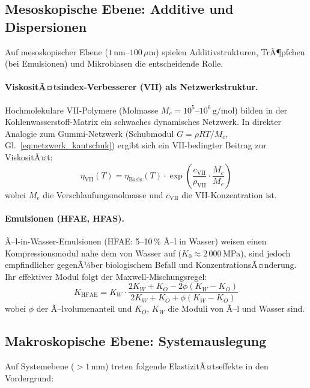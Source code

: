 ﻿\documentclass[a4paper,12pt]{scrreprt}
\theoremstyle{definition}
\begin{document}
\subsection{Mesoskopische Ebene: Additive und Dispersionen}

Auf mesoskopischer Ebene ($1\,\mathrm{nm}$--$100\,\mu\mathrm{m}$) spielen
Additivstrukturen, TrÃ¶pfchen (bei Emulsionen) und Mikroblasen die
entscheidende Rolle.

\paragraph{ViskositÃ¤tsindex-Verbesserer (VII) als Netzwerkstruktur.}
Hochmolekulare VII-Polymere (Molmasse $M_c = 10^5$--$10^6\,\mathrm{g/mol}$)
bilden in der Kohlenwasserstoff-Matrix ein schwaches dynamisches Netzwerk.
In direkter Analogie zum Gummi-Netzwerk (Schubmodul
$G = \rho R T / M_c$, Gl.~\eqref{eq:netzwerk_kautschuk}) ergibt sich
ein VII-bedingter Beitrag zur ViskositÃ¤t:
\begin{equation}
  \eta_{\mathrm{VII}}(T) = \eta_{\mathrm{Basis}}(T)
    \cdot \exp\!\left(\frac{c_{\mathrm{VII}}}{\rho_{\mathrm{VII}}} \cdot \frac{M_c}{M_e}\right)
  \label{eq:eta_vii}
\end{equation}
wobei $M_e$ die Verschlaufungsmolmasse und $c_{\mathrm{VII}}$ die
VII-Konzentration ist.

\paragraph{Emulsionen (HFAE, HFAS).}
Ã–l-in-Wasser-Emulsionen (HFAE: 5--10\,\% Ã–l in Wasser) weisen einen
Kompressionsmodul nahe dem von Wasser auf ($K_0 \approx 2\,000\,\mathrm{MPa}$),
sind jedoch empfindlicher gegenÃ¼ber biologischem Befall und Konzentrations\-Ã¤nderung.
Ihr effektiver Modul folgt der Maxwell-Mischungsregel:
\begin{equation}
  K_{\mathrm{HFAE}} = K_W \cdot
    \frac{2K_W + K_O - 2\phi(K_W - K_O)}{2K_W + K_O + \phi(K_W - K_O)}
  \label{eq:maxwell_mischung}
\end{equation}
wobei $\phi$ der Ã–lvolumenanteil und $K_O$, $K_W$ die Moduli von Ã–l
und Wasser sind.

\subsection{Makroskopische Ebene: Systemauslegung}

Auf Systemebene ($> 1\,\mathrm{mm}$) treten folgende ElastizitÃ¤tseffekte
in den Vordergrund:
\end{document}
